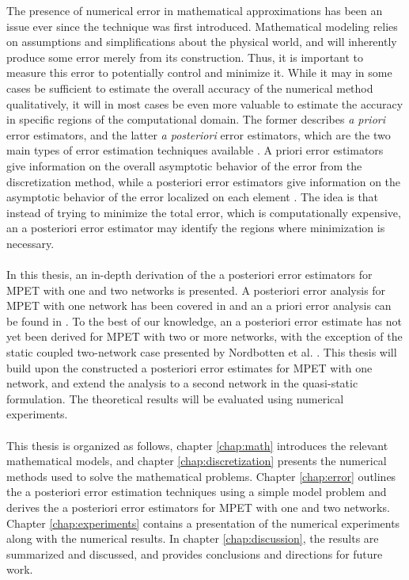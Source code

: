 The presence of numerical error in mathematical approximations has been an issue ever since the technique was first introduced. Mathematical modeling relies on assumptions and simplifications about the physical world, and will inherently produce some error merely from its construction. Thus, it is important to measure this error to potentially control and minimize it. While it may in some cases be sufficient to estimate the overall accuracy of the numerical method qualitatively, it will in most cases be even more valuable to estimate the accuracy in specific regions of the computational domain. The former describes \textit{a priori} error estimators, and the latter \textit{a posteriori} error estimators, which are the two main types of error estimation techniques available \cite{verfurth96, ainsworth}. A priori error estimators give information on the overall asymptotic behavior of the error from the discretization method, while a posteriori error estimators give information on the asymptotic behavior of the error localized on each element \cite{verfurth92}. The idea is that instead of trying to minimize the total error, which is computationally expensive, an a posteriori error estimator may identify the regions where minimization is necessary. 
\\
\\
In this thesis, an in-depth derivation of the a posteriori error estimators for MPET with one and two networks is presented. A posteriori error analysis for MPET with one network has been covered in \cite{meunier, riedlbeck} and an a priori error analysis can be found in \cite{murad1, murad2, murad3}. To the best of our knowledge, an a posteriori error estimate has not yet been derived for MPET with two or more networks, with the exception of the static coupled two-network case presented by Nordbotten et al. \cite{nordbotten}. This thesis will build upon the constructed a posteriori error estimates for MPET with one network, and extend the analysis to a second network in the quasi-static formulation. The theoretical results will be evaluated using numerical experiments. 
\\
\\
This thesis is organized as follows, chapter \ref{chap:math} introduces the relevant mathematical models, and chapter \ref{chap:discretization} presents the numerical methods used to solve the mathematical problems. Chapter \ref{chap:error} outlines the a posteriori error estimation techniques using a simple model problem and derives the a posteriori error estimators for MPET with one and two networks. Chapter \ref{chap:experiments} contains a presentation of the numerical experiments along with the numerical results. In chapter \ref{chap:discussion}, the results are summarized and discussed, and provides conclusions and directions for future work.
